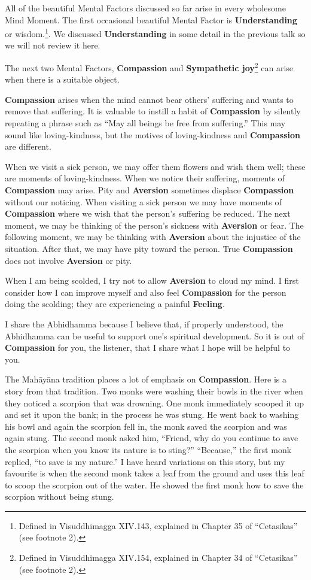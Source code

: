 All of the beautiful Mental Factors discussed so far arise in every wholesome Mind Moment. The first occasional beautiful Mental Factor is \textbf{Understanding} or wisdom.\footnote{Defined in Visuddhimagga XIV.143, explained in Chapter 35 of “Cetasikas” (see footnote 2).}. We discussed \textbf{Understanding} in some detail in the previous talk so we will not review it here.

The next two Mental Factors, \textbf{Compassion} and \textbf{Sympathetic joy}\footnote{Defined in Visuddhimagga XIV.154, explained in Chapter 34 of “Cetasikas” (see footnote 2).} can arise when there is a suitable object.

\textbf{Compassion} arises when the mind cannot bear others’ suffering and wants to remove that suffering. It is valuable to instill a habit of \textbf{Compassion} by silently repeating a phrase such as “May all beings be free from suffering.” This may sound like loving-kindness, but the motives of loving-kindness and \textbf{Compassion} are different.

When we visit a sick person, we may offer them flowers and wish them well; these are moments of loving-kindness. When we notice their suffering, moments of \textbf{Compassion} may arise. Pity and \textbf{Aversion} sometimes displace \textbf{Compassion} without our noticing. When visiting a sick person we may have moments of \textbf{Compassion} where we wish that the person’s suffering be reduced. The next moment, we may be thinking of the person’s sickness with \textbf{Aversion} or fear. The following moment, we may be thinking with \textbf{Aversion} about the injustice of the situation. After that, we may have pity toward the person. True \textbf{Compassion} does not involve \textbf{Aversion} or pity.

When I am being scolded, I try not to allow \textbf{Aversion} to cloud my mind. I first consider how I can improve myself and also feel \textbf{Compassion} for the person doing the scolding; they are experiencing a painful \textbf{Feeling}.

I share the Abhidhamma because I believe that, if properly understood, the Abhidhamma can be useful to support one’s spiritual development. So it is out of \textbf{Compassion} for you, the listener, that I share what I hope will be helpful to you.

The Mahāyāna tradition places a lot of emphasis on \textbf{Compassion}. Here is a story from that tradition. Two monks were washing their bowls in the river when they noticed a scorpion that was drowning. One monk immediately scooped it up and set it upon the bank; in the process he was stung. He went back to washing his bowl and again the scorpion fell in, the monk saved the scorpion and was again stung. The second monk asked him, “Friend, why do you continue to save the scorpion when you know its nature is to sting?” “Because,” the first monk replied, “to save is my nature.” I have heard variations on this story, but my favourite is when the second monk takes a leaf from the ground and uses this leaf to scoop the scorpion out of the water. He showed the first monk how to save the scorpion without being stung.

